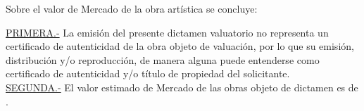 
Sobre el valor de Mercado de la obra art\'istica se concluye:

\textcolor{principal}{\underline{PRIMERA.-}} La emisi\'on del presente dictamen valuatorio no representa un certificado de autenticidad de la obra objeto de valuaci\'on, por lo que su emisi\'on, distribuci\'on y/o reproducci\'on, de manera alguna puede entenderse como certificado de autenticidad y/o t\'itulo de propiedad del solicitante.\\



\textcolor{principal}{\underline{SEGUNDA.-}} El valor estimado de Mercado de las obras objeto de dictamen es de \insertar.\\

\vspace{2cm}